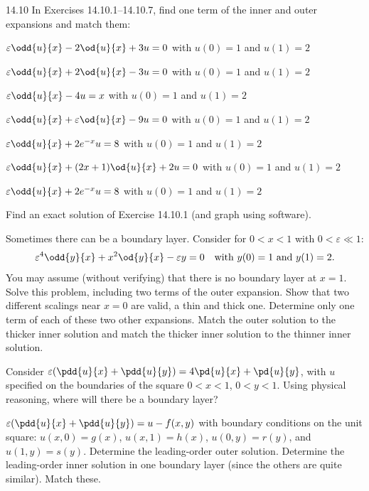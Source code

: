 \begin{exercises}{14.10}
In Exercises 14.10.1--14.10.7, find one term of the inner and outer expansions and match them:

\item $\varepsilon\odd{u}{x} - 2\od{u}{x} + 3u = 0$ with $u(0) = 1$ and $u(1) = 2$

\item $\varepsilon\odd{u}{x} + 2\od{u}{x} - 3u = 0$ with $u(0) = 1$ and $u(1) = 2$

\item[\starred] $\varepsilon\odd{u}{x} - 4u = x$ with $u(0) = 1$ and $u(1) = 2$

\item $\varepsilon\odd{u}{x} + \varepsilon\od{u}{x} - 9u = 0$ with $u(0) = 1$ and $u(1) = 2$

\item $\varepsilon\odd{u}{x} + 2e^{-x}u = 8$ with $u(0) = 1$ and $u(1) = 2$

\item[\starred] $\varepsilon\odd{u}{x} + (2x+1)\od{u}{x} + 2u = 0$ with $u(0) = 1$ and $u(1) = 2$

\item $\varepsilon\odd{u}{x} + 2e^{-x}u = 8$ with $u(0) = 1$ and $u(1) = 2$

\item Find an exact solution of Exercise 14.10.1 (and graph using software).

\item Sometimes there can be a boundary layer. Consider for $0 < x < 1$ with $0 < \varepsilon \ll 1$:
\[
\varepsilon^4\odd{y}{x} + x^2\od{y}{x} - \varepsilon y = 0 \quad \text{with } y(0) = 1 \text{ and } y(1) = 2.
\]
You may assume (without verifying) that there is no boundary layer at $x = 1$. Solve this problem, including two terms of the outer expansion. Show that two different scalings near $x = 0$ are valid, a thin and thick one. Determine only one term of each of these two other expansions. Match the outer solution to the thicker inner solution and match the thicker inner solution to the thinner inner solution.

\item Consider $\varepsilon(\pdd{u}{x} + \pdd{u}{y}) = 4\pd{u}{x} + \pd{u}{y}$, with $u$ specified on the boundaries of the square $0 < x < 1$, $0 < y < 1$. Using physical reasoning, where will there be a boundary layer?

\item $\varepsilon(\pdd{u}{x} + \pdd{u}{y}) = u - f(x,y)$ with boundary conditions on the unit square: $u(x,0) = g(x)$, $u(x,1) = h(x)$, $u(0,y) = r(y)$, and $u(1,y) = s(y)$. Determine the leading-order outer solution. Determine the leading-order inner solution in one boundary layer (since the others are quite similar). Match these.
\end{exercises}
